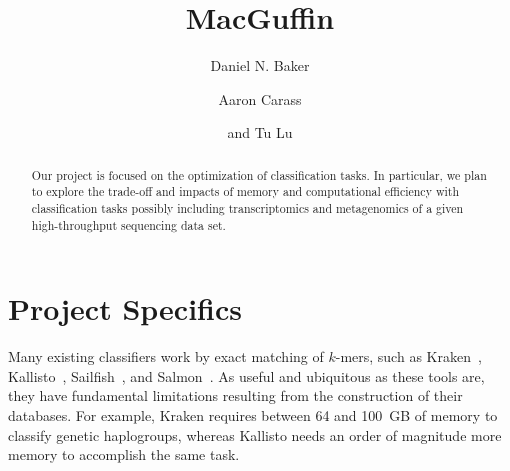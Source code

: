 \documentclass{elsarticle}
\begin{document}


\begin{frontmatter}
%
\title{MacGuffin}
%
\author{Daniel N. Baker}
%
\author{Aaron Carass}
%
\author{and Tu Lu}

\begin{abstract}
%
Our project is focused on the optimization of classification tasks.
In particular, we plan to explore the trade-off and impacts of memory
and computational efficiency with classification tasks possibly
including transcriptomics and metagenomics of a given high-throughput
sequencing data set.
%
\end{abstract}

\end{frontmatter}


\section*{Project Specifics}
%
\label{s:ps}
%
Many existing classifiers work by exact matching of $k$-mers, such as
Kraken~\citep{wood2014gb}, Kallisto~\citep{bray2016},
Sailfish~\citep{patro2014nbioptech}, and
Salmon~\citep{patro2015bioRxiv}. As useful and ubiquitous as these
tools are, they have fundamental limitations resulting from the
construction of their databases. For example, Kraken requires between
64 and 100~GB of memory to classify genetic haplogroups, whereas
Kallisto needs an order of magnitude more memory to accomplish the
same task.
\end{document}
